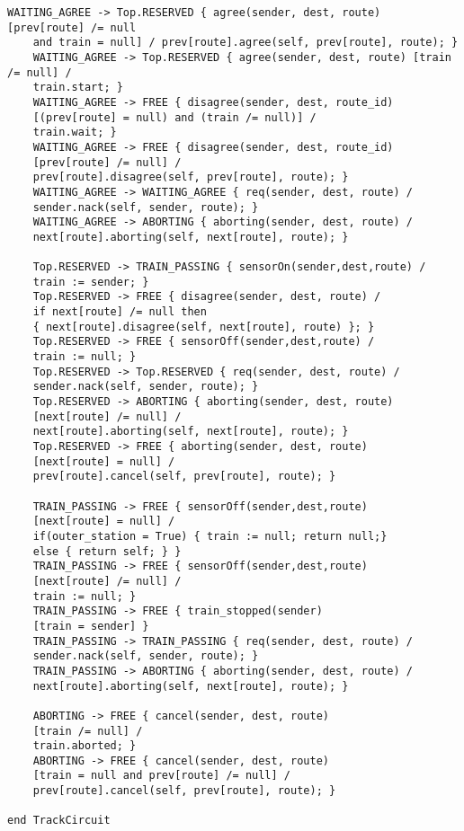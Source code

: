 \begin{lstlisting}[caption={modello della classe TrackCircuit}]
    WAITING_AGREE -> Top.RESERVED { agree(sender, dest, route) [prev[route] /= null 
    and train = null] / prev[route].agree(self, prev[route], route); }
    WAITING_AGREE -> Top.RESERVED { agree(sender, dest, route) [train /= null] / 
    train.start; }
    WAITING_AGREE -> FREE { disagree(sender, dest, route_id) 
    [(prev[route] = null) and (train /= null)] / 
    train.wait; }
    WAITING_AGREE -> FREE { disagree(sender, dest, route_id) 
    [prev[route] /= null] / 
    prev[route].disagree(self, prev[route], route); }
    WAITING_AGREE -> WAITING_AGREE { req(sender, dest, route) / 
    sender.nack(self, sender, route); }
    WAITING_AGREE -> ABORTING { aborting(sender, dest, route) / 
    next[route].aborting(self, next[route], route); }

    Top.RESERVED -> TRAIN_PASSING { sensorOn(sender,dest,route) / 
    train := sender; }
    Top.RESERVED -> FREE { disagree(sender, dest, route) / 
    if next[route] /= null then 
    { next[route].disagree(self, next[route], route) }; }
    Top.RESERVED -> FREE { sensorOff(sender,dest,route) / 
    train := null; }
    Top.RESERVED -> Top.RESERVED { req(sender, dest, route) / 
    sender.nack(self, sender, route); }
    Top.RESERVED -> ABORTING { aborting(sender, dest, route) 
    [next[route] /= null] / 
    next[route].aborting(self, next[route], route); }
    Top.RESERVED -> FREE { aborting(sender, dest, route) 
    [next[route] = null] / 
    prev[route].cancel(self, prev[route], route); }

    TRAIN_PASSING -> FREE { sensorOff(sender,dest,route) 
    [next[route] = null] / 
    if(outer_station = True) { train := null; return null;} 
    else { return self; } }
    TRAIN_PASSING -> FREE { sensorOff(sender,dest,route) 
    [next[route] /= null] / 
    train := null; }
    TRAIN_PASSING -> FREE { train_stopped(sender) 
    [train = sender] }
    TRAIN_PASSING -> TRAIN_PASSING { req(sender, dest, route) / 
    sender.nack(self, sender, route); }
    TRAIN_PASSING -> ABORTING { aborting(sender, dest, route) / 
    next[route].aborting(self, next[route], route); }

    ABORTING -> FREE { cancel(sender, dest, route) 
    [train /= null] / 
    train.aborted; }
    ABORTING -> FREE { cancel(sender, dest, route) 
    [train = null and prev[route] /= null] / 
    prev[route].cancel(self, prev[route], route); }

end TrackCircuit

\end{lstlisting}
